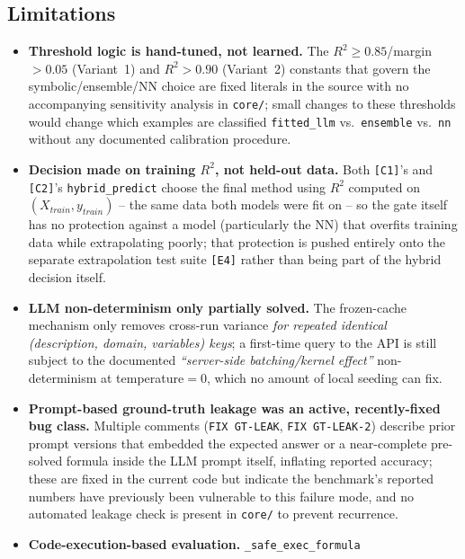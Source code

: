 \documentclass[11pt,a4paper]{article}
\newcommand{\code}[1]{\texttt{\small #1}}
\begin{document}
\subsection{Limitations}
\begin{itemize}
  \item \textbf{Threshold logic is hand-tuned, not learned.} The
        $R^2\geq0.85$/margin$>0.05$ (Variant~1) and $R^2>0.90$
        (Variant~2) constants that govern the symbolic/ensemble/NN choice
        are fixed literals in the source with no accompanying sensitivity
        analysis in \code{core/}; small changes to these thresholds would
        change which examples are classified \code{fitted\_llm} vs.\
        \code{ensemble} vs.\ \code{nn} without any documented calibration
        procedure.
  \item \textbf{Decision made on training $R^2$, not held-out data.}
        Both \code{[C1]}'s and \code{[C2]}'s \code{hybrid\_predict} choose
        the final method using $R^2$ computed on $(X_{train}, y_{train})$
        -- the same data both models were fit on -- so the gate itself has
        no protection against a model (particularly the NN) that overfits
        training data while extrapolating poorly; that protection is
        pushed entirely onto the separate extrapolation test suite
        \code{[E4]} rather than being part of the hybrid decision itself.
  \item \textbf{LLM non-determinism only partially solved.} The frozen-cache
        mechanism only removes cross-run variance \emph{for repeated
        identical (description, domain, variables) keys}; a first-time
        query to the API is still subject to the documented
        \emph{``server-side batching/kernel effect''} non-determinism at
        temperature$=0$, which no amount of local seeding can fix.
  \item \textbf{Prompt-based ground-truth leakage was an active,
        recently-fixed bug class.} Multiple comments (\code{FIX GT-LEAK},
        \code{FIX GT-LEAK-2}) describe prior prompt versions that embedded
        the expected answer or a near-complete pre-solved formula inside
        the LLM prompt itself, inflating reported accuracy; these are
        fixed in the current code but indicate the benchmark's reported
        numbers have previously been vulnerable to this failure mode, and
        no automated leakage check is present in \code{core/} to prevent
        recurrence.
  \item \textbf{Code-execution-based evaluation.} \code{\_safe\_exec\_formula}

\end{itemize}
\end{document}
